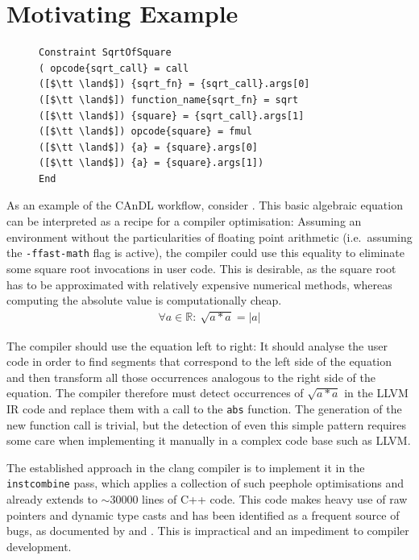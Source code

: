 \section{Motivating Example}

\begin{figure}[b]
\centering
\begin{minipage}[t]{0.67\textwidth}
\begin{lstlisting}[language=CAnDL,label={fig:candlspec},caption=
   {The left side of \Cref{fig:root} as specified in CAnDL\parfillskip=0pt}]
Constraint SqrtOfSquare
( opcode{sqrt_call} = call
([$\tt \land$]) {sqrt_fn} = {sqrt_call}.args[0]
([$\tt \land$]) function_name{sqrt_fn} = sqrt
([$\tt \land$]) {square} = {sqrt_call}.args[1]
([$\tt \land$]) opcode{square} = fmul
([$\tt \land$]) {a} = {square}.args[0]
([$\tt \land$]) {a} = {square}.args[1])
End
\end{lstlisting}
\end{minipage}
\end{figure}

    As an example of the CAnDL workflow, consider .
    This basic algebraic equation can be interpreted as a recipe for a compiler
    optimisation:
    Assuming an environment without the particularities of floating point
    arithmetic (i.e.\ assuming the \texttt{-ffast-math} flag is active), the
    compiler could use this equality to eliminate some square root invocations
    in user code.
    This is desirable, as the square root has to be approximated with relatively
    expensive numerical methods, whereas computing the absolute value is
    computationally cheap.
    \begin{align}
    \label{fig:root}
    \forall a\in \mathbb{R}\colon\ \sqrt{a*a}=|a|
    \end{align}

    The compiler should use the equation left to right:
    It should analyse the user code in order to find segments that correspond to
    the left side of the equation and then transform all those occurrences
    analogous to the right side of the equation.
    The compiler therefore must detect occurrences of $\sqrt{a*a}$ in the
    LLVM IR code and replace them with a call to the \texttt{abs} function.
    The generation of the new function call is trivial, but the detection of
    even this simple pattern requires some care when implementing it manually in
    a complex code base such as LLVM.

    The established approach in the clang compiler is to implement it in the
    \texttt{instcombine} pass, which applies a collection of such
    peephole optimisations and already extends to $\sim30000$ lines of
    C++ code.
    This code makes heavy use of raw pointers and dynamic type casts and has
    been identified as a frequent source of bugs, as documented by
    \citet{Yang:2011:FUB:1993316.1993532} and
    \citet{Menendez:2017:ADP:3062341.3062372}.
    This is impractical and an impediment to compiler development.


